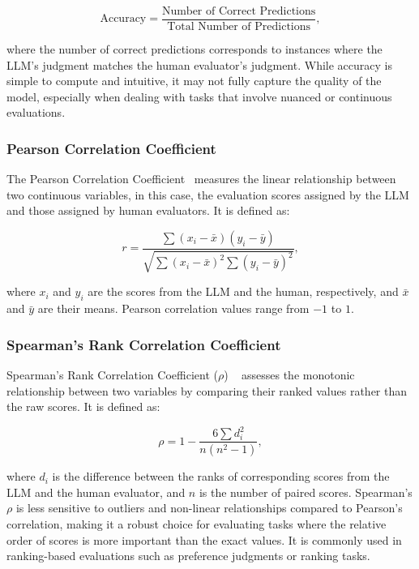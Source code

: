 \begin{equation}
    \text{Accuracy} = \frac{\text{Number of Correct Predictions}}{\text{Total Number of Predictions}},
\end{equation}

where the number of correct predictions corresponds to instances where the LLM's judgment matches the human evaluator's judgment. While accuracy is simple to compute and intuitive, it may not fully capture the quality of the model, especially when dealing with tasks that involve nuanced or continuous evaluations.




\subsubsection{Pearson Correlation Coefficient}

The Pearson Correlation Coefficient~\cite{cohen2009pearson} measures the linear relationship between two continuous variables, in this case, the evaluation scores assigned by the LLM and those assigned by human evaluators. It is defined as:

\begin{equation}
    r = \frac{\sum (x_i - \bar{x})(y_i - \bar{y})}{\sqrt{\sum (x_i - \bar{x})^2 \sum (y_i - \bar{y})^2}},
\end{equation}

where $x_i$ and $y_i$ are the scores from the LLM and the human, respectively, and $\bar{x}$ and $\bar{y}$ are their means. Pearson correlation values range from $-1$ to $1$.

\subsubsection{Spearman's Rank Correlation Coefficient}

Spearman's Rank Correlation Coefficient ($\rho$) ~\cite{sedgwick2014spearman} assesses the monotonic relationship between two variables by comparing their ranked values rather than the raw scores. It is defined as:

\begin{equation}
    \rho = 1 - \frac{6 \sum d_i^2}{n(n^2 - 1)},
\end{equation}

where $d_i$ is the difference between the ranks of corresponding scores from the LLM and the human evaluator, and $n$ is the number of paired scores.
Spearman's $\rho$ is less sensitive to outliers and non-linear relationships compared to Pearson's correlation, making it a robust choice for evaluating tasks where the relative order of scores is more important than the exact values. It is commonly used in ranking-based evaluations such as preference judgments or ranking tasks.


